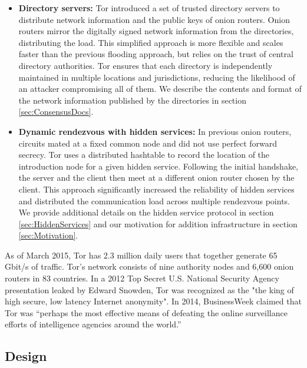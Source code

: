 \begin{itemize}
	\item \textbf{Directory servers:} Tor introduced a set of trusted directory servers to distribute network information and the public keys of onion routers. Onion routers mirror the digitally signed network information from the directories, distributing the load. This simplified approach is more flexible and scales faster than the previous flooding approach, but relies on the trust of central directory authorities. Tor ensures that each directory is independently maintained in multiple locations and jurisdictions, reducing the likelihood of an attacker compromising all of them.\cite{syverson2011peel} We describe the contents and format of the network information published by the directories in section \ref{sec:ConsensusDocs}.
	\item \textbf{Dynamic rendezvous with hidden services:} In previous onion routers, circuits mated at a fixed common node and did not use perfect forward secrecy. Tor uses a distributed hashtable to record the location of the introduction node for a given hidden service. Following the initial handshake, the server and the client then meet at a different onion router chosen by the client. This approach significantly increased the reliability of hidden services and distributed the communication load across multiple rendezvous points.\cite{dingledine2004tor} We provide additional details on the hidden service protocol in section \ref{sec:HiddenServices} and our motivation for addition infrastructure in section \ref{sec:Motivation}.
\end{itemize}

As of March 2015, Tor has 2.3 million daily users that together generate 65 Gbit/s of traffic. Tor's network consists of nine authority nodes and 6,600 onion routers in 83 countries.\cite{TorMetrics} In a 2012 Top Secret U.S. National Security Agency presentation leaked by Edward Snowden, Tor was recognized as the "the king of high secure, low latency Internet anonymity".\cite{landau2014highlights}\cite{plak2014anonymous} In 2014, BusinessWeek claimed that Tor was ``perhaps the most effective means of defeating the online surveillance efforts of intelligence agencies around the world.''\cite{TorBusinessWeek}

\subsection{Design}

